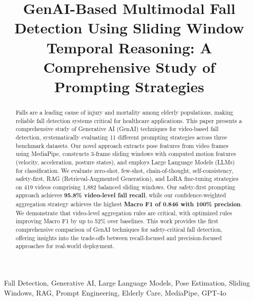 \documentclass[conference]{IEEEtran}
\begin{document}
\title{GenAI-Based Multimodal Fall Detection Using Sliding Window Temporal Reasoning: A Comprehensive Study of Prompting Strategies}

\author{
}

\maketitle

\begin{abstract}
Falls are a leading cause of injury and mortality among elderly populations, making reliable fall detection systems critical for healthcare applications. This paper presents a comprehensive study of Generative AI (GenAI) techniques for video-based fall detection, systematically evaluating 11 different prompting strategies across three benchmark datasets. Our novel approach extracts pose features from video frames using MediaPipe, constructs 3-frame sliding windows with computed motion features (velocity, acceleration, posture states), and employs Large Language Models (LLMs) for classification. We evaluate zero-shot, few-shot, chain-of-thought, self-consistency, safety-first, RAG (Retrieval-Augmented Generation), and LoRA fine-tuning strategies on 419 videos comprising 1,882 balanced sliding windows. Our safety-first prompting approach achieves \textbf{95.8\% video-level fall recall}, while our confidence-weighted aggregation strategy achieves the highest \textbf{Macro F1 of 0.846 with 100\% precision}. We demonstrate that video-level aggregation rules are critical, with optimized rules improving Macro F1 by up to 52\% over baselines. This work provides the first comprehensive comparison of GenAI techniques for safety-critical fall detection, offering insights into the trade-offs between recall-focused and precision-focused approaches for real-world deployment.
\end{abstract}

\begin{IEEEkeywords}
Fall Detection, Generative AI, Large Language Models, Pose Estimation, Sliding Windows, RAG, Prompt Engineering, Elderly Care, MediaPipe, GPT-4o
\end{IEEEkeywords}
\end{document}

